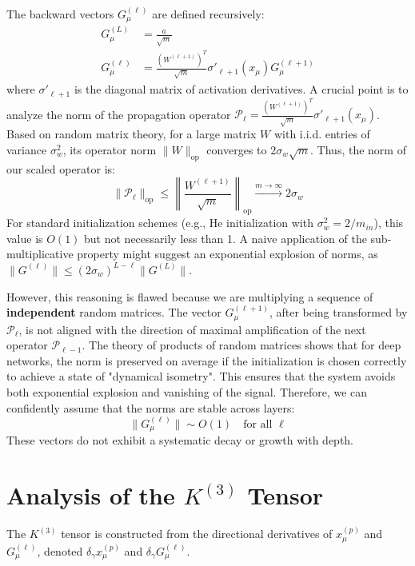 \documentclass[11pt,a4paper]{article}
\begin{document}
The backward vectors $G^{(\ell)}_\mu$ are defined recursively:
\begin{align}
    G^{(L)}_\mu &= \frac{a}{\sqrt{m}} \\
    G^{(\ell)}_\mu &= \frac{(W^{(\ell+1)})^T}{\sqrt{m}} \sigma'_{\ell+1}(x_\mu) G^{(\ell+1)}_\mu
\end{align}
where $\sigma'_{\ell+1}$ is the diagonal matrix of activation derivatives. A crucial point is to analyze the norm of the propagation operator $\mathcal{P}_\ell = \frac{(W^{(\ell+1)})^T}{\sqrt{m}} \sigma'_{\ell+1}(x_\mu)$. Based on random matrix theory, for a large matrix $W$ with i.i.d. entries of variance $\sigma_w^2$, its operator norm $\|W\|_{\text{op}}$ converges to $2\sigma_w\sqrt{m}$. Thus, the norm of our scaled operator is:
\begin{equation}
    \|\mathcal{P}_\ell\|_{\text{op}} \le \left\| \frac{W^{(\ell+1)}}{\sqrt{m}} \right\|_{\text{op}} \xrightarrow{m\to\infty} 2\sigma_w
\end{equation}
For standard initialization schemes (e.g., He initialization with $\sigma_w^2=2/m_{in}$), this value is $O(1)$ but not necessarily less than 1. A naive application of the sub-multiplicative property might suggest an exponential explosion of norms, as $\|G^{(\ell)}\| \le (2\sigma_w)^{L-\ell} \|G^{(L)}\|$.

However, this reasoning is flawed because we are multiplying a sequence of \textbf{independent} random matrices. The vector $G^{(\ell+1)}_\mu$, after being transformed by $\mathcal{P}_\ell$, is not aligned with the direction of maximal amplification of the next operator $\mathcal{P}_{\ell-1}$. The theory of products of random matrices shows that for deep networks, the norm is preserved on average if the initialization is chosen correctly to achieve a state of "dynamical isometry". This ensures that the system avoids both exponential explosion and vanishing of the signal. Therefore, we can confidently assume that the norms are stable across layers:
\begin{equation}
    \|G^{(\ell)}_\mu\| \sim O(1) \quad \text{for all } \ell
\end{equation}
These vectors do not exhibit a systematic decay or growth with depth.

\section{Analysis of the $K^{(3)}$ Tensor}

The $K^{(3)}$ tensor is constructed from the directional derivatives of $x^{(p)}_\mu$ and $G^{(\ell)}_\mu$, denoted $\delta_\gamma x^{(p)}_\mu$ and $\delta_\gamma G^{(\ell)}_\mu$.
\end{document}
